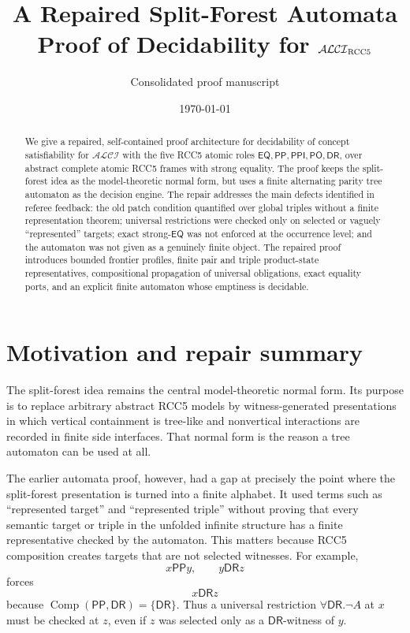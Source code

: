 \documentclass[11pt]{article}
\title{A Repaired Split-Forest Automata Proof of Decidability for $\ALCI_{\RCC}$}
\author{Consolidated proof manuscript}
\date{\today}
\newcommand{\ALCI}{\mathcal{ALCI}}
\newcommand{\EQ}{\mathsf{EQ}}
\newcommand{\PP}{\mathsf{PP}}
\newcommand{\PPI}{\mathsf{PPI}}
\newcommand{\PO}{\mathsf{PO}}
\newcommand{\DR}{\mathsf{DR}}
\newcommand{\Comp}{\operatorname{Comp}}
\begin{document}
\maketitle

\begin{abstract}
We give a repaired, self-contained proof architecture for decidability of concept satisfiability for $\ALCI$ with the five RCC5 atomic roles $\EQ,\PP,\PPI,\PO,\DR$, over abstract complete atomic RCC5 frames with strong equality.  The proof keeps the split-forest idea as the model-theoretic normal form, but uses a finite alternating parity tree automaton as the decision engine.  The repair addresses the main defects identified in referee feedback: the old patch condition quantified over global triples without a finite representation theorem; universal restrictions were checked only on selected or vaguely ``represented'' targets; exact strong-$\EQ$ was not enforced at the occurrence level; and the automaton was not given as a genuinely finite object.  The repaired proof introduces bounded frontier profiles, finite pair and triple product-state representatives, compositional propagation of universal obligations, exact equality ports, and an explicit finite automaton whose emptiness is decidable.
\end{abstract}

\tableofcontents

\section{Motivation and repair summary}

The split-forest idea remains the central model-theoretic normal form.  Its purpose is to replace arbitrary abstract RCC5 models by witness-generated presentations in which vertical containment is tree-like and nonvertical interactions are recorded in finite side interfaces.  That normal form is the reason a tree automaton can be used at all.

The earlier automata proof, however, had a gap at precisely the point where the split-forest presentation is turned into a finite alphabet.  It used terms such as ``represented target'' and ``represented triple'' without proving that every semantic target or triple in the unfolded infinite structure has a finite representative checked by the automaton.  This matters because RCC5 composition creates targets that are not selected witnesses.  For example,
\[
  x\PP y,\qquad y\DR z
\]
forces
\[
  x\DR z
\]
because $\Comp(\PP,\DR)=\{\DR\}$.  Thus a universal restriction $\forall\DR.\neg A$ at $x$ must be checked at $z$, even if $z$ was selected only as a $\DR$-witness of $y$.
\end{document}
